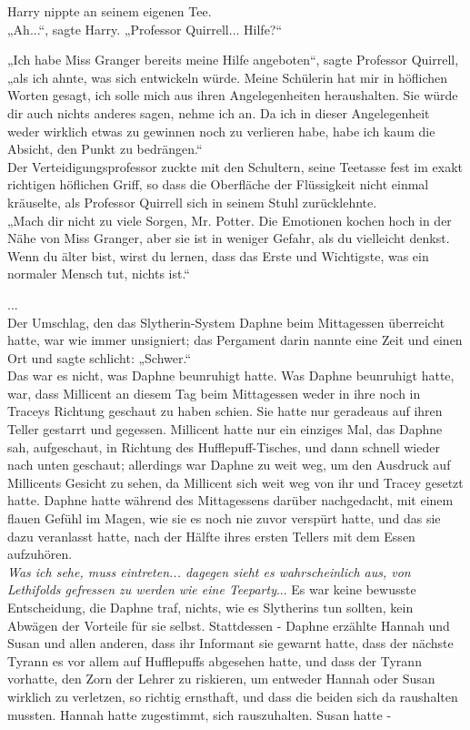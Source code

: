 {Harry nippte an seinem eigenen Tee.\\ „Ah...“, sagte Harry. „Professor Quirrell... Hilfe?“

„Ich habe Miss Granger bereits meine Hilfe angeboten“, sagte Professor Quirrell, „als ich ahnte, was sich entwickeln würde. Meine Schülerin hat mir in höflichen Worten gesagt, ich solle mich aus ihren Angelegenheiten heraushalten. Sie würde dir auch nichts anderes sagen, nehme ich an. Da ich in dieser Angelegenheit weder wirklich etwas zu gewinnen noch zu verlieren habe, habe ich kaum die Absicht, den Punkt zu bedrängen.“\\ Der Verteidigungsprofessor zuckte mit den Schultern, seine Teetasse fest im exakt richtigen höflichen Griff, so dass die Oberfläche der Flüssigkeit nicht einmal kräuselte, als Professor Quirrell sich in seinem Stuhl zurücklehnte.\\ „Mach dir nicht zu viele Sorgen, Mr. Potter. Die Emotionen kochen hoch in der Nähe von Miss Granger, aber sie ist in weniger Gefahr, als du vielleicht denkst. Wenn du älter bist, wirst du lernen, dass das Erste und Wichtigste, was ein normaler Mensch tut, nichts ist.“

...\\ Der Umschlag, den das Slytherin-System Daphne beim Mittagessen überreicht hatte, war wie immer unsigniert; das Pergament darin nannte eine Zeit und einen Ort und sagte schlicht: „Schwer.“\\ Das war es nicht, was Daphne beunruhigt hatte. Was Daphne beunruhigt hatte, war, dass Millicent an diesem Tag beim Mittagessen weder in ihre noch in Traceys Richtung geschaut zu haben schien. Sie hatte nur geradeaus auf ihren Teller gestarrt und gegessen. Millicent hatte nur ein einziges Mal, das Daphne sah, aufgeschaut, in Richtung des Hufflepuff-Tisches, und dann schnell wieder nach unten geschaut; allerdings war Daphne zu weit weg, um den Ausdruck auf Millicents Gesicht zu sehen, da Millicent sich weit weg von ihr und Tracey gesetzt hatte. Daphne hatte während des Mittagessens darüber nachgedacht, mit einem flauen Gefühl im Magen, wie sie es noch nie zuvor verspürt hatte, und das sie dazu veranlasst hatte, nach der Hälfte ihres ersten Tellers mit dem Essen aufzuhören.\\ \emph{Was ich sehe, muss eintreten... dagegen sieht es wahrscheinlich aus, von Lethifolds gefressen zu werden wie eine Teeparty}... Es war keine bewusste Entscheidung, die Daphne traf, nichts, wie es Slytherins tun sollten, kein Abwägen der Vorteile für sie selbst. Stattdessen - Daphne erzählte Hannah und Susan und allen anderen, dass ihr Informant sie gewarnt hatte, dass der nächste Tyrann es vor allem auf Hufflepuffs abgesehen hatte, und dass der Tyrann vorhatte, den Zorn der Lehrer zu riskieren, um entweder Hannah oder Susan wirklich zu verletzen, so richtig ernsthaft, und dass die beiden sich da raushalten mussten. Hannah hatte zugestimmt, sich rauszuhalten. Susan hatte -

}

